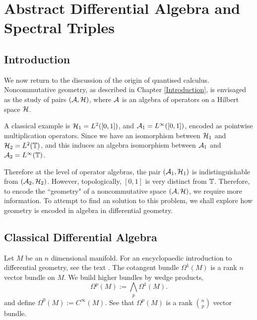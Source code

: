 
\chapter{Abstract Differential Algebra and Spectral Triples} %

\label{AbstractDifferentialAlgebra} %




\section{Introduction}
We now return to the discussion of the origin of quantised calculus. Noncommutative
geometry, as described in Chapter \ref{Introduction}, is envisaged
as the study of pairs $(\mathcal{A},\mathcal{H})$, where $\mathcal{A}$ is an algebra
of operators on a Hilbert space $\mathcal{H}$.

A classical example is $\mathcal{H}_1 = L^2([0,1])$, and $\mathcal{A}_1 = L^\infty([0,1])$,
encoded as pointwise multiplication operators. 
Since we have an isomorphism between $\mathcal{H}_1$ and $\mathcal{H}_2 = L^2(\mathbb{T})$, and
this induces an algebra isomorphism between $\mathcal{A}_1$ and $\mathcal{A}_2 = L^\infty(\mathbb{T})$.

Therefore at the level of operator algebras, the pair $(\mathcal{A}_1,\mathcal{H}_1)$ is indistinguishable
from $(\mathcal{A}_2,\mathcal{H}_2)$. However, topologically, $[0,1]$ is very distinct
from $\mathbb{T}$. Therefore, to encode the ``geometry" of a noncommutative
space $(\mathcal{A},\mathcal{H})$, we require more information. To attempt to find
an solution to this problem, we shall explore how geometry is encoded
in algebra in differential geometry.

\section{Classical Differential Algebra}
Let $M$ be an $n$ dimensional manifold. For
an encyclopaedic introduction to differential
geometry, see the text \cite{diffGeom}. The cotangent bundle $\Omega^1(M)$
is a rank $n$ vector bundle on $M$. We build higher bundles by wedge products,
\begin{equation*}
    \Omega^p(M) := \bigwedge_p \Omega^1(M).
\end{equation*}
and define $\Omega^0(M) := C^\infty(M)$. See that $\Omega^p(M)$ is
a rank $\binom{n}{p}$ vector bundle.


